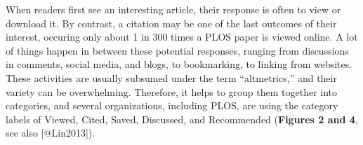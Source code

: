 When readers first see an interesting article, their response is often
to view or download it. By contrast, a citation may be one of the last
outcomes of their interest, occuring only about 1 in 300 times a PLOS
paper is viewed online. A lot of things happen in between these
potential responses, ranging from discussions in comments, social media,
and blogs, to bookmarking, to linking from websites. These activities
are usually subsumed under the term ``altmetrics,'' and their variety
can be overwhelming. Therefore, it helps to group them together into
categories, and several organizations, including PLOS, are using the
category labels of Viewed, Cited, Saved, Discussed, and Recommended
(\textbf{Figures 2 and 4}, see also {[}@Lin2013{]}).

\begin{Shaded}
\begin{Highlighting}[]


\StringTok{ }\NormalTok{(}\NormalTok{, } \NormalTok{,}
     \NormalTok{(}\NormalTok{, }\NormalTok{))}

\StringTok{ }\NormalTok{)}

\StringTok{ }
\StringTok{ }

\StringTok{ }\NormalTok{(}\NormalTok{, }\NormalTok{, }\NormalTok{, }\NormalTok{, }\NormalTok{, }\NormalTok{,}
    \NormalTok{, }\NormalTok{, }\NormalTok{, }\NormalTok{, }\NormalTok{, }\NormalTok{, }\NormalTok{)}


\end{Highlighting}
\end{Shaded}
